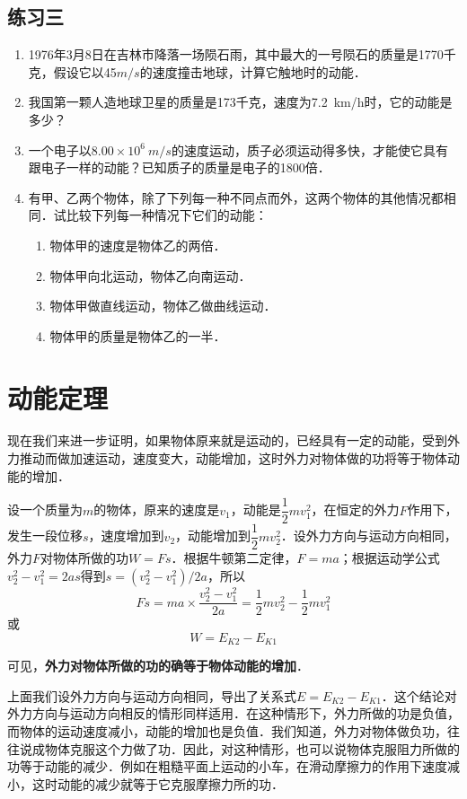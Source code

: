 \subsection*{练习三}
\begin{enumerate}
    \item 1976年3月8日在吉林市降落一场陨石雨，其中最大的一号陨石的质量是1770千克，假设它以45$\si{m/s}$的速度撞击地球，计算它触地时的动能．
    \item 我国第一颗人造地球卫星的质量是173千克，速度为\qty{7.2}{km/h}时，它的动能是多少？
    \item 一个电子以$8.00\times 10^6~\si{m/s}$的速度运动，质子必须运动得多快，才能使它具有跟电子一样的动能？已知质子的质量是电子的1800倍．
    \item 有甲、乙两个物体，除了下列每一种不同点而外，这两个物体的其他情况都相同．试比较下列每一种情况下它们的动能：
          \begin{enumerate}
              \item 物体甲的速度是物体乙的两倍．
              \item 物体甲向北运动，物体乙向南运动．
              \item 物体甲做直线运动，物体乙做曲线运动．
              \item 物体甲的质量是物体乙的一半．
          \end{enumerate}
\end{enumerate}
\newpage
\section{动能定理}

现在我们来进一步证明，如果物体原来就是运动的，已经具有一定的动能，受到外力推动而做加速运动，速度变大，动能增加，这时外力对物体做的功将等于物体动能的增加．

设一个质量为$m$的物体，原来的速度是$v_1$，动能是$\dfrac{1}{2}mv^2_1$，在恒定的外力$F$作用下，发生一段位移$s$，速度增加到$v_2$，动能增加到$\dfrac{1}{2}mv^2_2$．设外力方向与运动方向相同，外力$F$对物体所做的功$W=Fs$．根据牛顿第二定律，$F=ma$；根据运动学公式$v^2_2-v^2_1=2as$得到$s=(v^2_2-v^2_1)/2a$，所以
\[Fs=ma\times \frac{v^2_2-v^2_1}{2a}=\frac{1}{2}mv^2_2-\frac{1}{2}mv^2_1 \]
或
\[W=E_{K2}-E_{K1}\]

可见，\textbf{外力对物体所做的功的确等于物体动能的增加}．

上面我们设外力方向与运动方向相同，导出了关系式$E=E_{K2}-E_{K1}$．这个结论对外力方向与运动方向相反的情形同样适用．在这种情形下，外力所做的功是负值，而物体的运动速度减小，动能的增加也是负值．我们知道，外力对物体做负功，往往说成物体克服这个力做了功．因此，对这种情形，也可以说物体克服阻力所做的功等于动能的减少．例如在粗糙平面上运动的小车，在滑动摩擦力的作用下速度减小，这时动能的减少就等于它克服摩擦力所的功．


